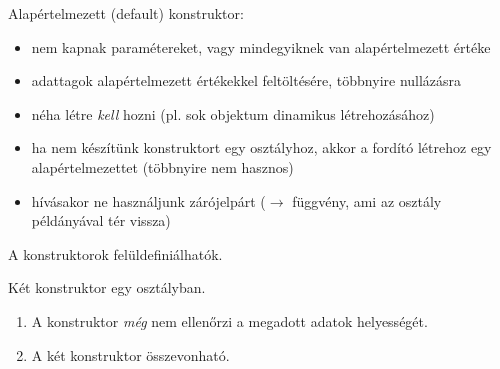 \documentclass[usenames,dvipsnames,aspectratio=169]{beamer}
\begin{document}
\begin{frame}
    \begin{exampleblock}{}
        \footnotesize
        
    \end{exampleblock}
\end{frame}

\begin{frame}
    Alapértelmezett (default) konstruktor:
    \begin{itemize}
        \item nem kapnak paramétereket, vagy mindegyiknek van alapértelmezett értéke
        \item adattagok alapértelmezett értékekkel feltöltésére, többnyire nullázásra
        \item néha létre \emph{kell} hozni (pl. sok objektum dinamikus létrehozásához)
        \item ha nem készítünk konstruktort egy osztályhoz, akkor a fordító létrehoz egy alapértelmezettet (többnyire nem hasznos)
        \item hívásakor ne használjunk zárójelpárt ($\to$ függvény, ami az osztály példányával tér vissza)
    \end{itemize}
    A konstruktorok felüldefiniálhatók.
\end{frame}

\begin{frame}
    Két konstruktor egy osztályban.
    \begin{exampleblock}{}
        
    \end{exampleblock}
\end{frame}

\begin{frame}
    \begin{exampleblock}{}
        
    \end{exampleblock}
\end{frame}

\begin{frame}
    \begin{exampleblock}{}
        \footnotesize
        
    \end{exampleblock}
    \vfill
    \begin{enumerate}
        \item A konstruktor \emph{még} nem ellenőrzi a megadott adatok helyességét.
        \item A két konstruktor összevonható.
    \end{enumerate}
\end{frame}
\end{document}
